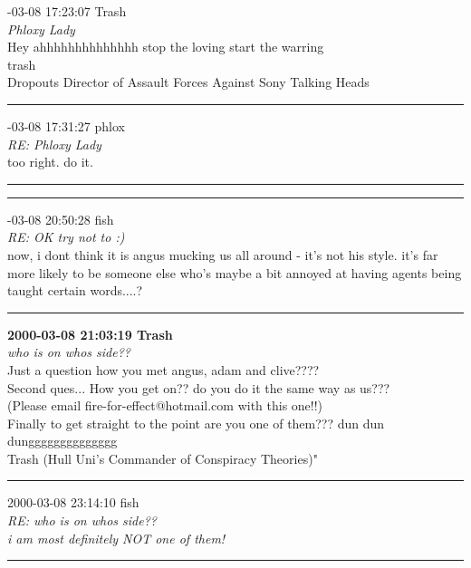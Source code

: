 \begin{mail}

{-03-08 17:23:07 Trash}\\
{\itshape Phloxy Lady}\\
Hey ahhhhhhhhhhhhhh stop the loving start the warring\\
trash\\
Dropouts Director of Assault Forces Against Sony Talking Heads\\

\rule{0.8\textwidth}{.4pt}

{-03-08 17:31:27 phlox}\\
{\itshape RE: Phloxy Lady}\\
too right. do it.\\

\rule{0.8\textwidth}{.4pt}



\rule{0.8\textwidth}{.4pt}


{-03-08 20:50:28 fish}\\
{\itshape RE: OK try not to :)}\\
now, i dont think it is angus mucking us all around - it's not his style. it's far more likely to be someone 
else who's maybe a bit annoyed at having agents being taught certain words....?	\\

\rule{0.8\textwidth}{.4pt}

{\bf2000-03-08 21:03:19	Trash}	\\
{\itshape who is on whos side??}\\
Just a question how you met angus, adam and clive????\\
Second ques... How you get on?? do you do it the same way as us??? \\
(Please email fire-for-effect@hotmail.com with this one!!)\\
Finally to get straight to the point are you one of them??? dun dun dungggggggggggggg \\
Trash (Hull Uni's Commander of Conspiracy Theories)"	\\

\rule{0.8\textwidth}{.4pt}

{2000-03-08 23:14:10 fish}\\
{\itshape RE: who is on whos side??}\\
{\itshape i am most definitely NOT one of them!}\\

\rule{0.8\textwidth}{.4pt}


\end{mail}
